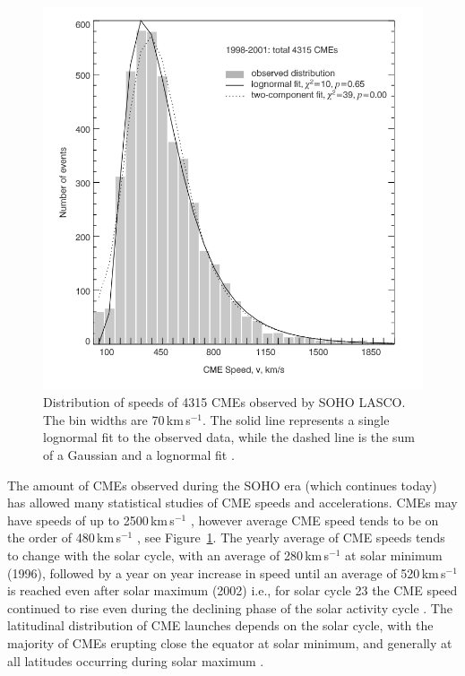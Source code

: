\begin{figure}[!t]
\begin{center}
\includegraphics[scale=0.4, trim=0cm 1cm 0cm 1cm]{images/cme_speed_histo}
\caption[Distribution of CME speeds]{Distribution of speeds of 4315 CMEs observed by SOHO LASCO. The bin widths are 70\,km\,s$^{-1}$. The solid line represents a single lognormal fit to the observed data, while the dashed line is the sum of a Gaussian and a lognormal fit \citep{yurch2005}. }
\label{fig:yurch2005}
\end{center}
\end{figure}
The amount of CMEs observed during the SOHO era (which continues today) has allowed many statistical studies of CME speeds and accelerations. CMEs {\color{blue} may have speeds of up to} 2500\,km\,s$^{-1}$ \citep{gopal2004}, however average CME speed tends to be on the order of 480\,km\,s$^{-1}$ \citep{yurch2005, webb2012}, see Figure~\ref{fig:yurch2005}. %
The yearly average of CME speeds tends to change with the solar cycle, with an average of 280\,km\,s$^{-1}$ at solar minimum (1996), followed by a year on year increase in speed until an average of 520\,km\,s$^{-1}$ is reached even after solar maximum (2002) i.e., for solar cycle 23 the CME speed continued to rise even during the declining phase of the solar activity cycle \citep{yashiro2004}. The latitudinal distribution of CME launches depends on the solar cycle, with the majority of CMEs erupting close the equator at solar minimum, and generally at all latitudes occurring during solar maximum \citep{yashiro2004}.
